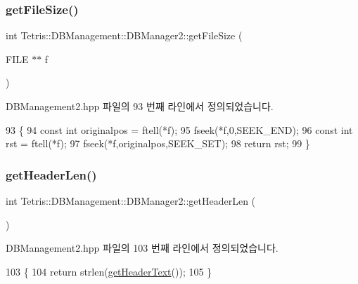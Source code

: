 \subsubsection{\texorpdfstring{get\+File\+Size()}{getFileSize()}}
{\footnotesize\ttfamily int Tetris\+::\+D\+B\+Management\+::\+D\+B\+Manager2\+::get\+File\+Size (\begin{DoxyParamCaption}\item[{F\+I\+LE $\ast$$\ast$}]{f }\end{DoxyParamCaption})\hspace{0.3cm}{\ttfamily [inline]}}



D\+B\+Management2.\+hpp 파일의 93 번째 라인에서 정의되었습니다.


\begin{DoxyCode}
93                                      \{
94                 \textcolor{keyword}{const} \textcolor{keywordtype}{int} originalpos = ftell(*f);
95                 fseek(*f,0,SEEK\_END);
96                 \textcolor{keyword}{const} \textcolor{keywordtype}{int} rst = ftell(*f);
97                 fseek(*f,originalpos,SEEK\_SET);
98                 \textcolor{keywordflow}{return} rst;
99             \}
\end{DoxyCode}
\mbox{\label{class_tetris_1_1_d_b_management_1_1_d_b_manager2_acac0c763f7ff5fe5c5eda0c83e0b41bd}} 
\subsubsection{\texorpdfstring{get\+Header\+Len()}{getHeaderLen()}}
{\footnotesize\ttfamily int Tetris\+::\+D\+B\+Management\+::\+D\+B\+Manager2\+::get\+Header\+Len (\begin{DoxyParamCaption}{ }\end{DoxyParamCaption})\hspace{0.3cm}{\ttfamily [inline]}}



D\+B\+Management2.\+hpp 파일의 103 번째 라인에서 정의되었습니다.


\begin{DoxyCode}
103                               \{
104                 \textcolor{keywordflow}{return} strlen(\hyperlink{class_tetris_1_1_d_b_management_1_1_d_b_manager2_a80b688a47f643121f2391f858d61ea13}{getHeaderText}());
105             \}
\end{DoxyCode}
\mbox{\label{class_tetris_1_1_d_b_management_1_1_d_b_manager2_a80b688a47f643121f2391f858d61ea13}} 
